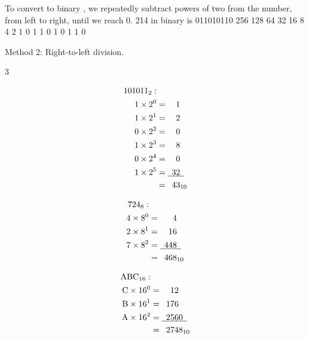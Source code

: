 To convert to binary , we repeatedly subtract powers of two from
the number, from left to right, until we reach 0.
214 in binary is 011010110
256 128 64 32 16 8 4 2 1
0 1 1 0 1 0 1 1 0

Method 2: Right-to-left division.
\vspace{-\baselineskip}

\begin{multicols}{3}

  \begin{align*}
    {101011}_{2} : & \\
    1 \times 2 ^ 0 &=             \hphantom{00}1             \\
    1 \times 2 ^ 1 &=             \hphantom{00}2             \\
    0 \times 2 ^ 2 &=             \hphantom{00}0             \\
    1 \times 2 ^ 3 &=             \hphantom{00}8             \\
    0 \times 2 ^ 4 &=             \hphantom{00}0             \\
    1 \times 2 ^ 5 &= \underline{\hphantom{0}32\hphantom{0}} \\
                   &=           {\hphantom{0}43}_{10}        \\
  \end{align*}

  \columnbreak

  \begin{align*}
    {724}_{8} : & \\
    4 \times 8 ^ 0 &=            \hphantom{000}4              \\
    2 \times 8 ^ 1 &=            \hphantom{00}16              \\
    7 \times 8 ^ 2 &= \underline{\hphantom{0}448\hphantom{0}} \\
                   &=           {\hphantom{0}468}_{10}        \\
  \end{align*}

  \columnbreak

  \begin{align*}
    \text{ABC}_{16} : & \\
    \text{C} \times 16 ^ 0 &=             \hphantom{00}12              \\
    \text{B} \times 16 ^ 1 &=             \hphantom{0}176              \\
    \text{A} \times 16 ^ 2 &= \underline{\hphantom{0}2560\hphantom{0}} \\
                           &=           {\hphantom{0}2748}_{10}        \\
  \end{align*}
\end{multicols}

